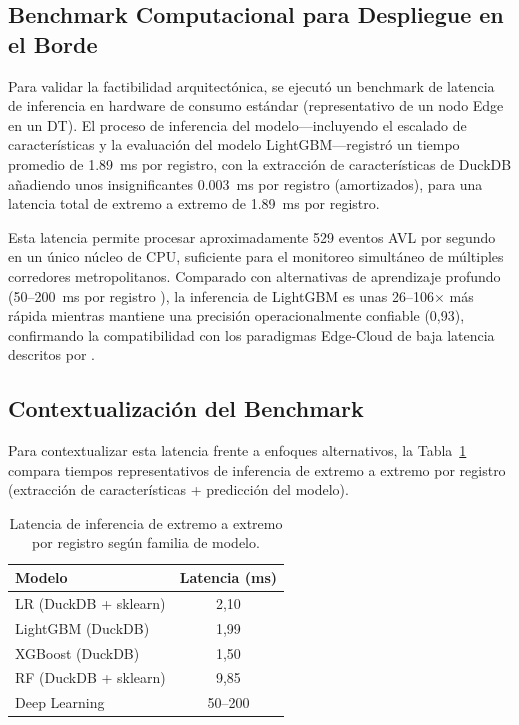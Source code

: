 \documentclass[fleqn,10pt,lineno]{wlpeerj}
\begin{document}
\subsection{Benchmark Computacional para Despliegue en el Borde}

Para validar la factibilidad arquitect\'onica, se ejecut\'o un benchmark de latencia de inferencia en hardware de consumo est\'andar (representativo de un nodo Edge en un DT). El proceso de inferencia del modelo---incluyendo el escalado de caracter\'isticas y la evaluaci\'on del modelo LightGBM---registr\'o un tiempo promedio de \SI{1,89}{\ms} por registro, con la extracci\'on de caracter\'isticas de DuckDB a\~nadiendo unos insignificantes \SI{0,003}{\ms} por registro (amortizados), para una latencia total de extremo a extremo de \SI{1,89}{\ms} por registro.

Esta latencia permite procesar aproximadamente 529 eventos AVL por segundo en un \'unico n\'ucleo de CPU, suficiente para el monitoreo simult\'aneo de m\'ultiples corredores metropolitanos. Comparado con alternativas de aprendizaje profundo (50--200~ms por registro \citep{19}), la inferencia de LightGBM es unas 26--106$\times$ m\'as r\'apida mientras mantiene una precisi\'on operacionalmente confiable (0,93), confirmando la compatibilidad con los paradigmas Edge-Cloud de baja latencia descritos por \citet{26}.

\subsection{Contextualizaci\'on del Benchmark}

Para contextualizar esta latencia frente a enfoques alternativos, la Tabla~\ref{tab:benchmark_context} compara tiempos representativos de inferencia de extremo a extremo por registro (extracci\'on de caracter\'isticas + predicci\'on del modelo).

\begin{table}[htbp]
  \caption{Latencia de inferencia de extremo a extremo por registro seg\'un familia de modelo.}
  \centering
  \begin{tabular}{@{}lc@{}}
    \toprule
    \textbf{Modelo} & \textbf{Latencia (ms)} \\ \midrule
    LR (DuckDB + sklearn)    & 2,10         \\
    LightGBM (DuckDB)        & 1,99         \\
    XGBoost (DuckDB)         & 1,50         \\
    RF (DuckDB + sklearn)    & 9,85         \\
    Deep Learning \citep{19} & 50--200      \\ \bottomrule
  \end{tabular}
  \label{tab:benchmark_context}
\end{table}
\end{document}
